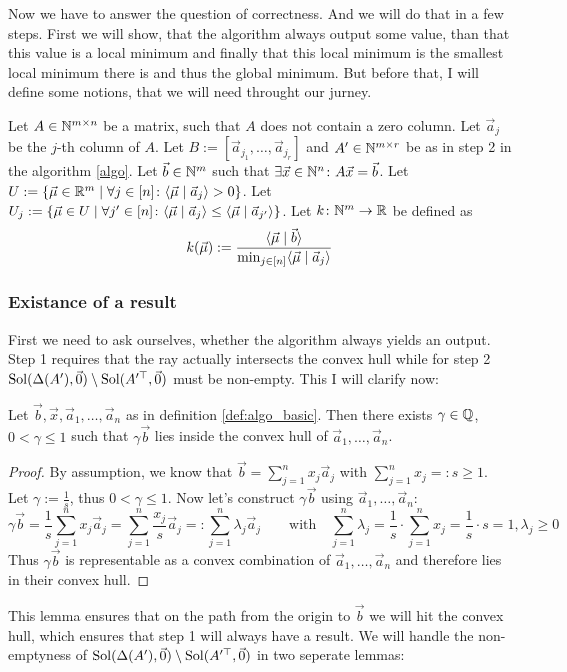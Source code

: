 Now we have to answer the question of correctness. And we will do that in a few steps. First we will show, that the algorithm always output some value, than that this value is a local minimum and finally that this local minimum is the smallest local minimum there is and thus the global minimum. But before that, I will define some notions, that we will need throught our jurney.
\begin{definition}
    \label{def:algo_basic}
    Let $A \in \mathbb{N}^{m \times n}$ be a matrix, such that $A$ does not contain a zero column. Let $\vec a_j$ be the $j$-th column of $A$. Let $B := [\vec a_{j_1}, \dots, \vec a_{j_r}]$ and $A' \in \mathbb{N}^{m\times r}$ be as in step 2 in the algorithm \ref{algo}. Let $\vec b \in \mathbb{N}^m$ such that $\exists \vec x \in \mathbb{N}^n\colon A\vec x = \vec b$. Let $U := \{\vec\mu \in \mathbb{R}^m\mid \forall j \in [n]\colon\langle \vec\mu \mid \vec a_j \rangle > 0\}$. Let $U_j := \{\vec\mu \in U \mid \forall j'\in[n]\colon \langle \vec\mu \mid \vec a_j \rangle \leq \langle \vec\mu \mid \vec a_{j'} \rangle\}$. Let $k\colon \mathbb{N}^m\to\mathbb{R}$ be defined as 
    $$k(\vec\mu) := \frac{\langle \vec\mu \mid \vec b \rangle}{\min_{j\in[n]}\langle \vec\mu \mid \vec a_j \rangle}$$
\end{definition}

\subsubsection{Existance of a result}
First we need to ask ourselves, whether the algorithm always yields an output. Step 1 requires that the ray actually intersects the convex hull while for step 2 $\operatorname{Sol}(\Delta(A'), \vec0) \setminus \operatorname{Sol}(A'^\top, \vec0)$ must be non-empty. This I will clarify now:

\begin{lemma}
    \label{lemma:b_behind_hull}
    Let $\vec b, \vec x, \vec a_1, \dots, \vec a_n$ as in definition \ref{def:algo_basic}. Then there exists $\gamma \in \mathbb{Q}$, $0 < \gamma \leq 1$ such that $\gamma \vec b$ lies inside the convex hull of $\vec a_1, \dots, \vec a_n$.
\end{lemma}
\begin{proof}
    By assumption, we know that $\vec b = \sum_{j=1}^{n}x_j \vec a_j$ with $\sum_{j=1}^{n}x_j =: s \geq 1$. Let $\gamma := \frac{1}{s}$, thus $0 < \gamma \leq 1$. Now let's construct $\gamma\vec b$ using $\vec a_1, \dots, \vec a_n$:
    $$\gamma\vec b = \frac{1}{s}\sum_{j=1}^{n}x_j \vec a_j = \sum_{j=1}^{n}\frac{x_j}{s}\vec a_j =: \sum_{j=1}^{n} \lambda_j\vec a_j \qquad \mathrm{with}\quad \sum_{j=1}^{n}\lambda_j = \frac{1}{s}\cdot \sum_{j=1}^{n} x_j = \frac{1}{s}\cdot s = 1, \lambda_j \geq 0$$
    Thus $\gamma\vec b$ is representable as a convex combination of $\vec a_1, \dots, \vec a_n$ and therefore lies in their convex hull.
\end{proof}
This lemma ensures that on the path from the origin to $\vec b$ we will hit the convex hull, which ensures that step 1 will always have a result. We will handle the non-emptyness of $\operatorname{Sol}(\Delta(A'), \vec0) \setminus \operatorname{Sol}(A'^\top, \vec0)$ in two seperate lemmas: 

